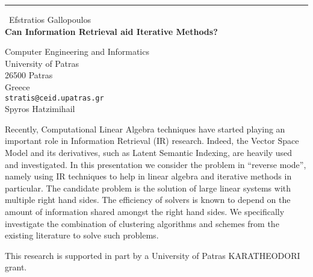 \documentclass{report}
\begin{document}
\begin{center}
\rule{6in}{1pt} \
{\large Efstratios Gallopoulos \\
{\bf Can Information Retrieval aid Iterative Methods? }}

Computer Engineering and Informatics \\ University of Patras \\ 26500 Patras \\ Greece
\\
{\tt stratis@ceid.upatras.gr}\\
Spyros Hatzimihail\end{center}

Recently, Computational Linear Algebra techniques have started playing an
important role in Information Retrieval (IR) research. Indeed, the Vector
Space Model and its derivatives, such as Latent Semantic Indexing, are
heavily used and investigated. In this presentation we consider the
problem in ``reverse mode'', namely using IR techniques to help in linear
algebra and iterative
methods in particular. The candidate problem is the solution of large
linear systems with multiple right hand sides. The
efficiency of solvers is known to depend on the amount of information
shared amongst the right hand sides.
We specifically investigate the combination of clustering algorithms and
schemes from the existing literature to solve such problems.

This research is supported in part by a University of Patras KARATHEODORI grant.
\end{document}
